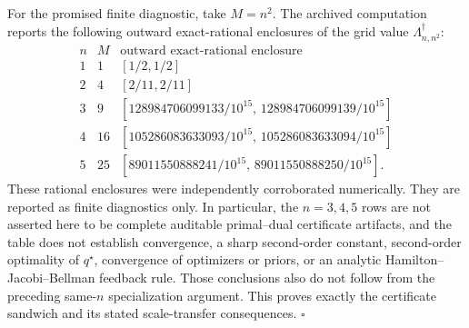 For the promised finite diagnostic, take \(M=n^2\).  The archived computation reports the following outward exact-rational enclosures of the grid value \(\Lambda_{n,n^2}^\dagger\):
\[
\begin{array}{c|c|c}
n&M&\text{outward exact-rational enclosure}\ \\ \hline
1&1&[1/2,1/2]\\
2&4&[2/11,2/11]\\
3&9&[128984706099133/10^{15},\,128984706099139/10^{15}]\\
4&16&[105286083633093/10^{15},\,105286083633094/10^{15}]\\
5&25&[89011550888241/10^{15},\,89011550888250/10^{15}].
\end{array}
\]
These rational enclosures were independently corroborated numerically.  They are reported as finite diagnostics only.  In particular, the \(n=3,4,5\) rows are not asserted here to be complete auditable primal--dual certificate artifacts, and the table does not establish convergence, a sharp second-order constant, second-order optimality of \(q^\star\), convergence of optimizers or priors, or an analytic Hamilton--Jacobi--Bellman feedback rule.  Those conclusions also do not follow from the preceding same-\(n\) specialization argument.  This proves exactly the certificate sandwich and its stated scale-transfer consequences. \(\square\)